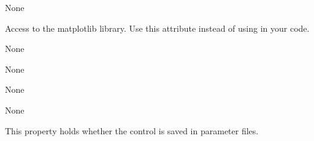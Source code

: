 \documentclass[letterpaper,10pt,english]{sphinxmanual}
\begin{document}
\begin{fulllineitems}

\begin{fulllineitems}
\label{api:mpl.Canvas.key_release_action}
None

\end{fulllineitems}


\begin{fulllineitems}
\label{api:mpl.Canvas.matplotlib}
Access to the matplotlib library. Use this attribute instead of 
using  in your code.

\end{fulllineitems}


\begin{fulllineitems}
\label{api:mpl.Canvas.motion_notify_action}
None

\end{fulllineitems}


\begin{fulllineitems}
\label{api:mpl.Canvas.pick_action}
None

\end{fulllineitems}


\begin{fulllineitems}
\label{api:mpl.Canvas.pop_event}
None

\end{fulllineitems}


\begin{fulllineitems}
\label{api:mpl.Canvas.resize_action}
None

\end{fulllineitems}


\begin{fulllineitems}
\label{api:mpl.Canvas.save}
This property holds whether the control is saved in parameter files.


\end{fulllineitems}
\end{fulllineitems}
\end{document}
